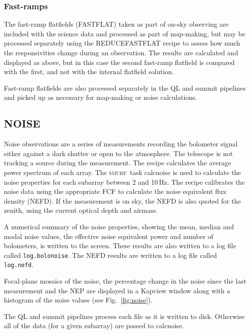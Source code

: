 \documentclass[twoside,11pt]{article}
\renewcommand{\_}{\texttt{\symbol{95}}}
\newcommand{\SMURF}{\textsc{smurf}}
\newcommand{\task}[1]{\textsf{#1}}
\begin{document}
\subsubsection{Fast-ramps}

The fast-ramp flatfields (FASTFLAT) taken as part of on-sky observing
are included with the science data and processed as part of
map-making, but may be processed separately using the
\task{REDUCE\_FASTFLAT} recipe to assess how much the responsivities
change during an observation. The results are calculated and displayed
as above, but in this case the second fast-ramp flatfield is compared
with the first, and not with the internal flatfield solution.

Fast-ramp flatfields are also processed separately in the QL and
summit pipelines and picked up as necessary for map-making or noise
calculations.

\subsection{NOISE}

Noise observations are a series of measurements recording the
bolometer signal either against a dark shutter or open to the
atmosphere. The telescope is not tracking a source during the
measurement. The recipe calculates the average power spectrum of each
array. The \SMURF\ task \task{calcnoise} is used to calculate the
noise properties for each subarray between 2 and 10\,Hz. The recipe
calibrates the noise data using the appropriate FCF to calculate the
noise equivalent flux density (NEFD). If the measurement is on sky,
the NEFD is also quoted for the zenith, using the current optical
depth and airmass.

A numerical summary of the noise properties, showing the mean, median
and modal noise values, the effective noise equivalent power and
number of bolometers, is written to the screen. These results are also
written to a log file called \verb+log.bolonoise+. The NEFD results
are written to a log file called \verb+log.nefd+.

Focal-plane mosaics of the noise, the percentage change in the noise
since the last measurement and the NEP are displayed in a Kapview
window along with a histogram of the noise values (see
Fig.~\ref{fig:noise}).

The QL and summit pipelines process each file as it is written to
disk. Otherwise all of the data (for a given subarray) are passed to
\task{calcnoise}.
\end{document}

